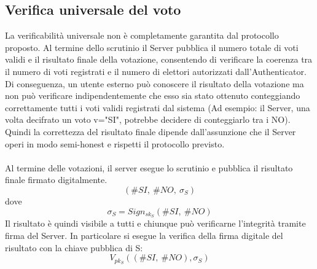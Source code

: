 \subsection{Verifica universale del voto}
La verificabilità universale non è completamente garantita dal protocollo proposto. Al termine dello scrutinio il Server pubblica il numero totale di voti validi e il risultato finale della votazione, consentendo di verificare la coerenza tra il numero di voti registrati e il numero di elettori autorizzati dall'Authenticator. Di conseguenza, un utente esterno può conoscere il risultato della votazione ma non può verificare indipendentemente che esso sia stato ottenuto conteggiando correttamente tutti i voti validi registrati dal sistema (Ad esempio: il Server, una volta decifrato un voto v="SI", potrebbe decidere di conteggiarlo tra i NO). \\
Quindi la correttezza del risultato finale dipende dall'assunzione che il Server operi in modo semi-honest e rispetti il protocollo previsto. \\ \\
Al termine delle votazioni, il server esegue lo scrutinio e pubblica il risultato finale firmato digitalmente. $$(\# SI,\ \# NO,\ \sigma_S)$$ dove $$\sigma_S=Sign_{sk_S}(\# SI,\ \# NO)$$
Il risultato è quindi visibile a tutti e chiunque può verificarne l'integrità tramite firma del Server.
In particolare si esegue la verifica della firma digitale del risultato con la chiave pubblica di S:
$$ V_{pk_S}((\# SI,\ \# NO), \sigma_S) $$
	
	
	
	
	
	
	
	
	
	
	
	
	
	
	
	
	
	
	
	
	
	
	
	